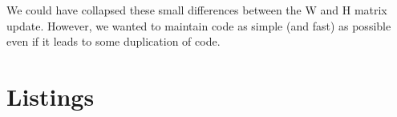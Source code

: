\documentclass[a4paper,12pt]{article}
\newcommand{\javalisting}[2]{
	
}
\begin{document}
We could have collapsed these small differences between the W and H matrix update.
However, we wanted to maintain code as simple (and fast) as possible even if it leads to some duplication of code.






\nocite{*}
\appendix
\section*{Listings}
\label{sec:listings}

\javalisting{Map1Text}{Code of the first Map Reduce phase implemented using Text. We assume that the vector is saved on multiple files stored in a folder with the filename starting with V. Similarly for the matrix A. }

\pagebreak

\javalisting{IntAndIdWritable}{IntAndIdWritable class. This class implements both methods from the Writable and the Comparable interface. We omitted constructors and getter/setter methods for clarity.}

\javalisting{HPhase1}{First phase of matrix vector multiplication (Figure \ref{fig:Map1}).}




\end{document}
